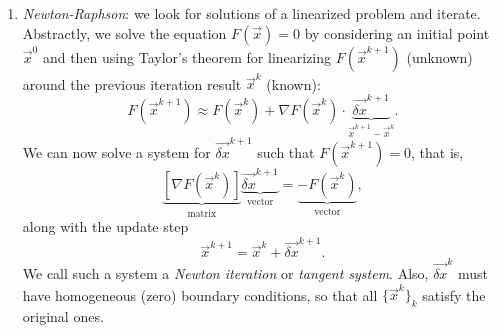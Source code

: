 \begin{enumerate}
    \item \emph{Newton-Raphson}: we look for solutions of a linearized problem and iterate. Abstractly, we solve the equation $F(\vec x)=0$ by considering an initial point $\vec x^0$ and then using Taylor's theorem for linearizing $F(\vec x^{k+1})$ (unknown) around the previous iteration result $\vec x^k$ (known):
    \begin{equation*}
        F(\vec x^{k+1}) \approx F(\vec x^k) + \nabla F(\vec x^k)\cdot \underbrace{\vec{\delta x}^{k+1}}_{\vec x^{k+1} - \vec{x}^k}.
    \end{equation*}
    We can now solve a system for $\vec{\delta x}^{k+1}$ such that $F(\vec x^{k+1}) = 0$, that is,
    \begin{equation*}
        \underbrace{[\nabla F(\vec x^k)]}_{\text{matrix}} \underbrace{\vec{\delta x}^{k+1}}_{\text{vector}} = \underbrace{-F(\vec x^k)}_{\text{vector}},
    \end{equation*}
    along with the update step
    \begin{equation*}
        \vec x^{k+1} = \vec{x}^k + \vec{\delta x}^{k+1}.
    \end{equation*}
    We call such a system a \emph{Newton iteration} or \emph{tangent system}. Also, $\vec{\delta x}^{k}$ must have homogeneous (zero) boundary conditions, so that all $\{\vec x^{k}\}_k$ satisfy the original ones. 
    

\end{enumerate}
